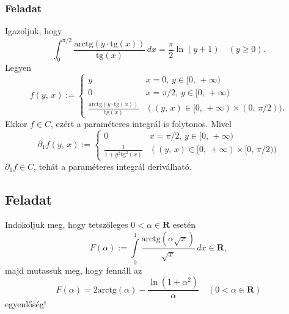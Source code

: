\documentclass{article}
\newcommand{\R}{\mathbf{R}}
\begin{document}
	\subsubsection{Feladat}
	Igazoljuk, hogy
	\[
		\int_0^{\pi / 2} \frac{\text{arctg} (y \cdot \text{tg}(x))}{\text{tg}(x)} \, dx = \frac{\pi}{2} \ln(y + 1) \quad (y \geq 0).
	\]
	Legyen
	\[
		f(y, \, x) := \begin{cases}
			y & x = 0, \, y \in [0, \, + \infty) \\
			0 & x = \pi / 2, \, y \in [0, \, + \infty) \\
			\displaystyle \frac{\text{arctg} (y \cdot \text{tg}(x))}{\text{tg}(x)} & ((y, \, x) \in [0, \, +\infty) \times (0, \, \pi / 2)).	
		\end{cases}
	\]
	Ekkor $f \in C$, ezért a paraméteres integrál is folytonos. Mivel
	\[
		\partial_1 f(y, \, x) := \begin{cases}
			0 & x = \pi / 2, \, y \in [0, \, + \infty) \\
			\displaystyle \frac{1}{1 + y^2 \text{tg}^2(x)} & ((y, \, x) \in [0, \, +\infty) \times [0, \, \pi / 2))
		\end{cases}
	\]
	$\partial_1f \in C$, tehát a paraméteres integrál deriválható.


	\subsection{Feladat}
	Indokoljuk meg, hogy tetszőleges $0 < \alpha \in \R$ esetén
	\[
		F(\alpha) := \int\limits_0^1 \frac{\text{arctg}(\alpha \sqrt{x})}{\sqrt{x}} \, dx \in \R,
	\]
	majd mutassuk meg, hogy fennáll az
	\[
		F(\alpha) = 2 \text{arctg}(\alpha) - \frac{\ln(1+\alpha^2)}{\alpha} \quad (0 < \alpha \in \R)
	\]
	egyenlőség!\\
\end{document}
